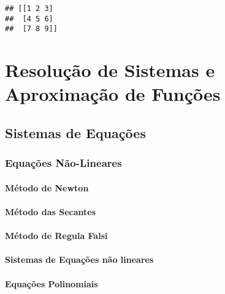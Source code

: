 \documentclass[
]{book}
\begin{document}
\begin{verbatim}
## [[1 2 3]
##  [4 5 6]
##  [7 8 9]]
\end{verbatim}

\hypertarget{part-resoluuxe7uxe3o-de-sistemas-e-aproximauxe7uxe3o-de-funuxe7uxf5es}{%
\part{Resolução de Sistemas e Aproximação de Funções}\label{part-resoluuxe7uxe3o-de-sistemas-e-aproximauxe7uxe3o-de-funuxe7uxf5es}}

\hypertarget{sistemas-de-equauxe7uxf5es}{%
\chapter{Sistemas de Equações}\label{sistemas-de-equauxe7uxf5es}}

\hypertarget{equauxe7uxf5es-nuxe3o-lineares}{%
\section{Equações Não-Lineares}\label{equauxe7uxf5es-nuxe3o-lineares}}

\hypertarget{muxe9todo-de-newton}{%
\subsection{Método de Newton}\label{muxe9todo-de-newton}}

\hypertarget{muxe9todo-das-secantes}{%
\subsection{Método das Secantes}\label{muxe9todo-das-secantes}}

\hypertarget{muxe9todo-de-regula-falsi}{%
\subsection{Método de Regula Falsi}\label{muxe9todo-de-regula-falsi}}

\hypertarget{sistemas-de-equauxe7uxf5es-nuxe3o-lineares}{%
\subsection{Sistemas de Equações não lineares}\label{sistemas-de-equauxe7uxf5es-nuxe3o-lineares}}

\hypertarget{equauxe7uxf5es-polinomiais}{%
\subsection{Equações Polinomiais}\label{equauxe7uxf5es-polinomiais}}
\end{document}
